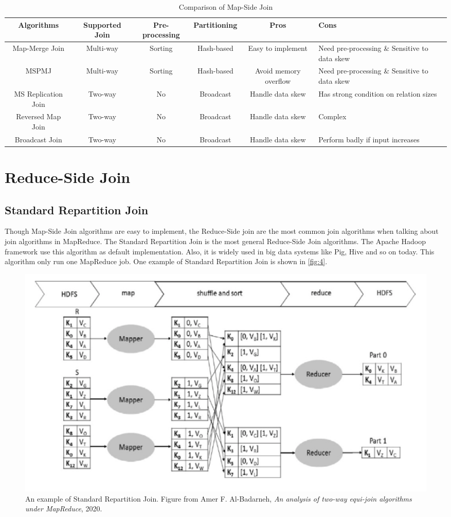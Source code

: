 \documentclass[sigconf, nonacm]{acmart}
\begin{document}
\begin{table}[t]
  \caption{Comparison of Map-Side Join}
  \label{tab:1}
  \begin{tabular}{|c|c|c|c|c|l|}
    \toprule
    Algorithms & Supported Join & Pre-processing &  Partitioning & Pros & Cons\\
    \hline\hline
    Map-Merge Join & Multi-way  & Sorting & Hash-based & Easy to implement & Need pre-processing \& Sensitive to data skew \\
    \hline
    MSPMJ & Multi-way & Sorting & Hash-based & Avoid memory overflow & Need pre-processing \& Sensitive to data skew\\
    \hline
    MS Replication Join & Two-way & No & Broadcast & Handle data skew & Has strong condition on relation sizes\\
    \hline
    Reversed Map Join & Two-way & No & Broadcast & Handle data skew & Complex \\
    \hline
    Broadcast Join & Two-way & No & Broadcast & Handle data skew & Perform badly if input increases\\
    
    \bottomrule
  \end{tabular}
\end{table}


\section{Reduce-Side Join}

\subsection{Standard Repartition Join}
Though Map-Side Join algorithms are easy to implement, the Reduce-Side join are the most common join algorithms when talking about join algorithms in MapReduce. The Standard Repartition Join is the most general Reduce-Side Join algorithms. The Apache Hadoop framework use this algorithm as default implementation. Also, it is widely used in big data systems like Pig, Hive and so on today.  This algorithm only run one MapReduce job. One example of Standard Repartition Join is shown in \autoref{fig:4}.

\begin{figure}[h]
  \centering
  \includegraphics[width=\linewidth]{figures/4.png}
  \caption{An example of Standard Repartition Join.  Figure from Amer F. Al-Badarneh, \textit{An analysis of two-way equi-join algorithms under MapReduce}, 2020.}
  \label{fig:4}
\end{figure}
\end{document}
